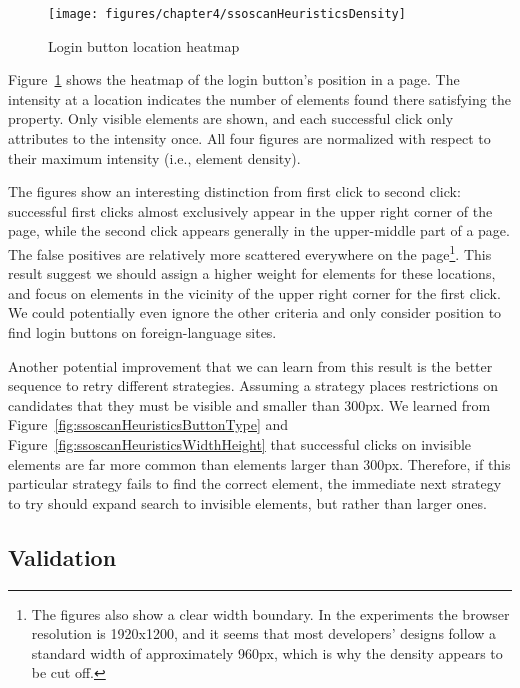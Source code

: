 \begin{figure}[tb]
\centering
\texttt{[image: figures/chapter4/ssoscanHeuristicsDensity]}
\caption{Login button location heatmap}
\label{fig:ssoscanHeuristicsDensity}
\end{figure}

 Figure~\ref{fig:ssoscanHeuristicsDensity} shows the heatmap of the login button's position in a page.  The intensity at a location indicates the number of elements found there satisfying the property.  Only visible elements are shown, and each successful click only attributes to the intensity once.  All four figures are normalized with respect to their maximum intensity (i.e., element density).

The figures show an interesting distinction from first click to second click: successful first clicks almost exclusively appear in the upper right corner of the page, while the second click appears generally in the upper-middle part of a page.  The false positives are relatively more scattered everywhere on the page\footnote{The figures also show a clear width boundary.  In the experiments the browser resolution is 1920x1200, and it seems that most developers' designs follow a standard width of approximately 960px, which is why the density appears to be cut off.}.  This result suggest we should assign a higher weight for elements for these locations, and focus on elements in the vicinity of the upper right corner for the first click.  We could potentially even ignore the other criteria and only consider position to find login buttons on foreign-language sites.

Another potential improvement that we can learn from this result is the better sequence to retry different strategies.  Assuming a strategy places restrictions on candidates that they must be visible and smaller than 300px.  We learned from Figure~\ref{fig:ssoscanHeuristicsButtonType} and Figure~\ref{fig:ssoscanHeuristicsWidthHeight} that successful clicks on invisible elements are far more common than elements larger than 300px.  Therefore, if this particular strategy fails to find the correct element, the immediate next strategy to try should expand search to invisible elements, but rather than larger ones.

\subsection{Validation}
\label{sec:sssoscanHeuristicsLaterStudy}

